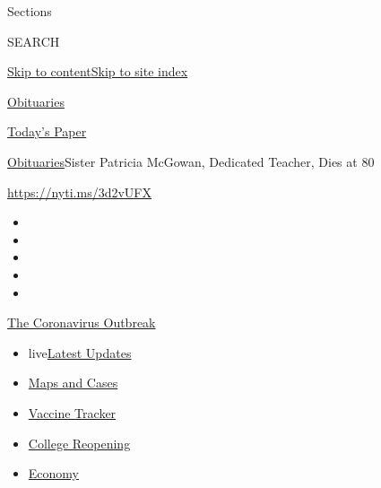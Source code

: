 Sections

SEARCH

\protect\hyperlink{site-content}{Skip to
content}\protect\hyperlink{site-index}{Skip to site index}

\href{https://www.nytimes3xbfgragh.onion/section/obituaries}{Obituaries}

\href{https://myaccount.nytimes3xbfgragh.onion/auth/login?response_type=cookie\&client_id=vi}{}

\href{https://www.nytimes3xbfgragh.onion/section/todayspaper}{Today's
Paper}

\href{/section/obituaries}{Obituaries}\textbar{}Sister Patricia McGowan,
Dedicated Teacher, Dies at 80

\url{https://nyti.ms/3d2vUFX}

\begin{itemize}
\item
\item
\item
\item
\item
\end{itemize}

\href{https://www.nytimes3xbfgragh.onion/news-event/coronavirus?action=click\&pgtype=Article\&state=default\&region=TOP_BANNER\&context=storylines_menu}{The
Coronavirus Outbreak}

\begin{itemize}
\tightlist
\item
  live\href{https://www.nytimes3xbfgragh.onion/2020/08/04/world/coronavirus-covid-19.html?action=click\&pgtype=Article\&state=default\&region=TOP_BANNER\&context=storylines_menu}{Latest
  Updates}
\item
  \href{https://www.nytimes3xbfgragh.onion/interactive/2020/us/coronavirus-us-cases.html?action=click\&pgtype=Article\&state=default\&region=TOP_BANNER\&context=storylines_menu}{Maps
  and Cases}
\item
  \href{https://www.nytimes3xbfgragh.onion/interactive/2020/science/coronavirus-vaccine-tracker.html?action=click\&pgtype=Article\&state=default\&region=TOP_BANNER\&context=storylines_menu}{Vaccine
  Tracker}
\item
  \href{https://www.nytimes3xbfgragh.onion/2020/08/02/us/covid-college-reopening.html?action=click\&pgtype=Article\&state=default\&region=TOP_BANNER\&context=storylines_menu}{College
  Reopening}
\item
  \href{https://www.nytimes3xbfgragh.onion/live/2020/08/03/business/stock-market-today-coronavirus?action=click\&pgtype=Article\&state=default\&region=TOP_BANNER\&context=storylines_menu}{Economy}
\end{itemize}

